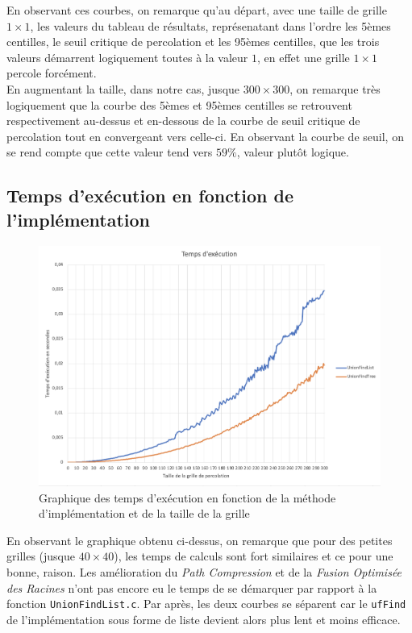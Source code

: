 \documentclass[12pt]{article}
\begin{document}
En observant ces courbes, on remarque qu'au départ, avec une taille de grille $1 \times 1$, les valeurs du tableau de résultats, 
représenatant dans l'ordre les 5èmes centilles, le seuil critique de percolation et les 95èmes centilles, que les trois valeurs démarrent
logiquement toutes à la valeur $1$, en effet une grille $1 \times 1$ percole forcément. 
\\
En augmentant la taille, dans notre cas, jusque 
$300 \times 300$, on remarque très logiquement que la courbe des 5èmes et 95èmes centilles se retrouvent respectivement au-dessus et en-dessous de 
la courbe de seuil critique de percolation tout en convergeant vers celle-ci. En observant la courbe de seuil, on se rend compte que cette valeur 
tend vers $59\%$, valeur plutôt logique.
\subsection{Temps d'exécution en fonction de l'implémentation}
\begin{figure}[!h]
    \centering
	\captionsetup{justification = centering}
    \includegraphics[scale = 0.3]{Temps.png}
    \caption{Graphique des temps d'exécution en fonction de la méthode d'implémentation et de la taille de la grille}
    \label{fig:my_label}
\end{figure}
En observant le graphique obtenu ci-dessus, on remarque que pour des petites grilles (jusque $40 \times 40$), les temps de calculs 
sont fort similaires et ce pour une bonne, raison. Les amélioration du \textit{Path Compression} et de la \textit{Fusion Optimisée des Racines} n'ont pas encore eu le temps de se démarquer par rapport 
à la fonction \texttt{UnionFindList.c}. Par après, les deux courbes se séparent car le \texttt{ufFind} de l'implémentation sous forme de liste devient alors plus lent et moins efficace.
\end{document}
